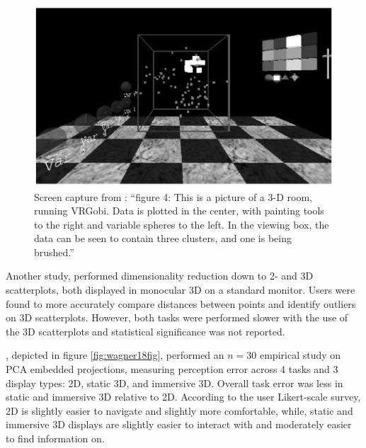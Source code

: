 \documentclass{monashthesis}
\begin{document}
\begin{figure}

{\centering \includegraphics[width=0.7\linewidth]{./figures/nelson98fig} 

}

\caption{Screen capture from \textcite{nelson_xgobi_1998}:
``figure 4: This is a picture of a 3-D room, running VRGobi. Data is
plotted in the center, with painting tools to the right and variable
spheres to the left. In the viewing box, the data can be seen to contain
three clusters, and one is being brushed.''}\label{fig:nelson98fig}
\end{figure}

Another study, \textcite{gracia_new_2016} performed dimensionality
reduction down to 2- and 3D scatterplots, both displayed in monocular 3D
on a standard monitor. Users were found to more accurately compare
distances between points and identify outliers on 3D scatterplots.
However, both tasks were performed slower with the use of the 3D
scatterplots and statistical significance was not reported.

\textcite{wagner_filho_immersive_2018}, depicted in figure
\ref{fig:wagner18fig}, performed an \(n=30\) empirical study on PCA
embedded projections, measuring perception error across 4 tasks and 3
display types: 2D, static 3D, and immersive 3D. Overall task error was
less in static and immersive 3D relative to 2D. According to the user
Likert-scale survey, 2D is slightly easier to navigate and slightly more
comfortable, while, static and immersive 3D displays are slightly easier
to interact with and moderately easier to find information on.
\end{document}
